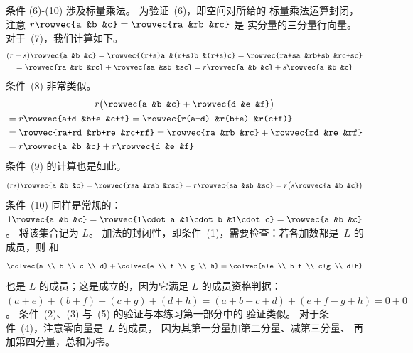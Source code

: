\begin{exercises}
\begin{answer}
\begin{exparts}
          条件 (6)-(10) 涉及标量乘法。
          为验证~(6)，即空间对所给的
          标量乘法运算封闭，
          注意 $r\rowvec{a  &b  &c}=\rowvec{ra  &rb  &rc}$ 是
          实分量的三分量行向量。
          对于~(7)，我们计算如下。
          \begin{multline*}
            (r+s)\rowvec{a  &b  &c}=\rowvec{(r+s)a  &(r+s)b  &(r+s)c}
            =\rowvec{ra+sa  &rb+sb  &rc+sc}                             \\
            =\rowvec{ra  &rb  &rc}+\rowvec{sa  &sb  &sc}
            =r\rowvec{a  &b  &c}+s\rowvec{a  &b  &c}
          \end{multline*}
          条件~(8) 非常类似。
          \begin{multline*}
            r\big(\rowvec{a  &b  &c}+\rowvec{d  &e  &f}\big)  \\
            \begin{aligned}
            &=r\rowvec{a+d  &b+e  &c+f}
            =\rowvec{r(a+d)  &r(b+e)  &r(c+f)}                     \\
            &=\rowvec{ra+rd  &rb+re  &rc+rf}
            =\rowvec{ra  &rb  &rc}+\rowvec{rd  &re  &rf}          \\
            &=r\rowvec{a  &b  &c}+r\rowvec{d  &e  &f}
            \end{aligned}
          \end{multline*}
          条件~(9) 的计算也是如此。
          \begin{equation*}
            (rs)\rowvec{a  &b  &c}
             =\rowvec{rsa  &rsb  &rsc}
             =r\rowvec{sa  &sb  &sc}
             =r\big(s\rowvec{a  &b  &c}\big)
          \end{equation*}
          条件~(10) 同样是常规的：
          $1\rowvec{a  &b  &c}
             =\rowvec{1\cdot a  &1\cdot b  &1\cdot c}
             =\rowvec{a  &b  &c}$。
        \partsitem
          将该集合记为 $L$。
          加法的封闭性，即条件~(1)，需要检查：若各加数都是~$L$ 的成员，则
          和
          \begin{equation*}
            \colvec{a \\ b \\ c \\ d}
            +\colvec{e \\ f \\ g \\ h}
            =
            \colvec{a+e \\ b+f \\ c+g \\ d+h}
          \end{equation*}
          也是 \( L \) 的成员；这是成立的，因为它满足
          $L$ 的成员资格判据：
          \( (a+e)+(b+f)-(c+g)+(d+h)
          =(a+b-c+d)+(e+f-g+h)=0+0 \)。
          条件~(2)、(3) 与~(5) 的验证与本练习第一部分中的
          验证类似。
          对于条件~(4)，注意零向量是~$L$ 的成员，
          因为其第一分量加第二分量、减第三分量、
          再加第四分量，总和为零。


\end{exparts}
\end{answer}
\end{exercises}
